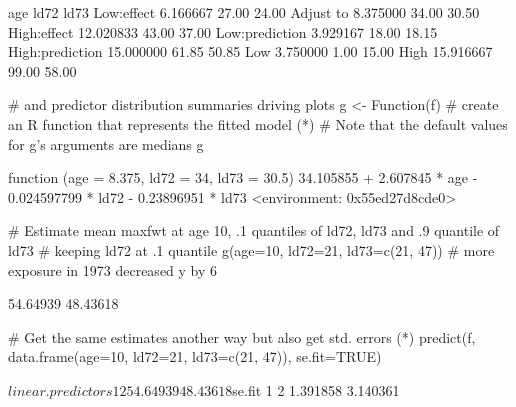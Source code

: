 \begin{Schunk}
\begin{Soutput}
                      age  ld72  ld73
Low:effect       6.166667 27.00 24.00
Adjust to        8.375000 34.00 30.50
High:effect     12.020833 43.00 37.00
Low:prediction   3.929167 18.00 18.15
High:prediction 15.000000 61.85 50.85
Low              3.750000  1.00 15.00
High            15.916667 99.00 58.00
\end{Soutput}
\begin{Sinput}
                      # and predictor distribution summaries driving plots
g <- Function(f)  # create an R function that represents the fitted model (*\ipacue*)
# Note that the default values for g's arguments are medians
g
\end{Sinput}
\begin{Soutput}
function (age = 8.375, ld72 = 34, ld73 = 30.5) 
{
    34.105855 + 2.607845 * age - 0.024597799 * ld72 - 0.23896951 * 
        ld73
}
<environment: 0x55ed27d8cde0>
\end{Soutput}
\begin{Sinput}
# Estimate mean maxfwt at age 10, .1 quantiles of ld72, ld73 and .9 quantile of ld73
# keeping ld72 at .1 quantile
g(age=10, ld72=21, ld73=c(21, 47))  # more exposure in 1973 decreased y by 6
\end{Sinput}
\begin{Soutput}
[1] 54.64939 48.43618
\end{Soutput}
\begin{Sinput}
# Get the same estimates another way but also get std. errors (*\ipacue*)
predict(f, data.frame(age=10, ld72=21, ld73=c(21, 47)), se.fit=TRUE)
\end{Sinput}
\begin{Soutput}
$linear.predictors
       1        2 
54.64939 48.43618 

$se.fit
       1        2 
1.391858 3.140361 
\end{Soutput}
\end{Schunk}

